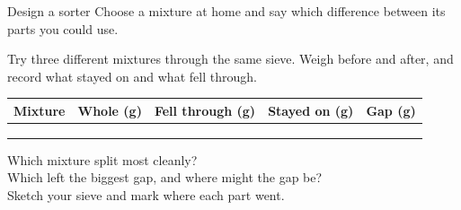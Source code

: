 \begin{puzzle}{Design a sorter}
Choose a mixture at home and say which difference between its parts you could use. \wline[6cm]
\end{puzzle}
\clearpage

\thispagestyle{fancy}
Try three different mixtures through the same sieve. Weigh before and after, and record what stayed on and what fell through.\par\medskip
\renewcommand{\arraystretch}{3.0}
\begin{tabularx}{\linewidth}{|>{\sffamily\small\bfseries}p{2.6cm}|X|X|X|X|}
\hline
Mixture & Whole (g) & Fell through (g) & Stayed on (g) & Gap (g) \\ \hline
 & & & & \\ \hline
 & & & & \\ \hline
 & & & & \\ \hline
\end{tabularx}

\vspace{8pt}
Which mixture split most cleanly? \wline[7cm]\\[10pt]
Which left the biggest gap, and where might the gap be? \wline[5cm]\\[10pt]
Sketch your sieve and mark where each part went.\par\medskip
{}
\clearpage
